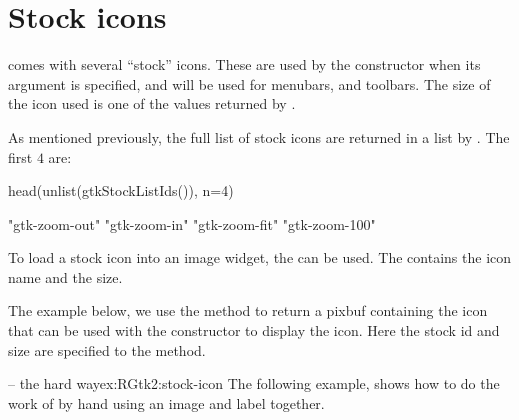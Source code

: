 \section{Stock icons}
\label{sec:RGtk2:stock-icons}

\GTK\/ comes with several ``stock'' icons. These are used by the
 constructor when its  argument
is specified, and will be used for menubars, and toolbars. The size of
the icon used is one of the values returned by .

As mentioned previously, the full list of stock icons are returned in
a list by . The first $4$ are:
\begin{Schunk}
\begin{Sinput}
 head(unlist(gtkStockListIds()), n=4)   
\end{Sinput}
\begin{Soutput}
[1] "gtk-zoom-out" "gtk-zoom-in"  "gtk-zoom-fit" "gtk-zoom-100"
\end{Soutput}
\end{Schunk}

To load a stock icon into an image widget, the
 can be used. The
 contains the icon name and
 the size. 

The example below, we use the method  to
return a pixbuf containing the icon that can be used with the
constructor  to display the
icon. Here the stock id and size are specified to the
 method.



\begin{example}{ -- the hard way}{ex:RGtk2:stock-icon}
The following example, shows how to do the work of
 by hand using an image and label together.
\begin{Schunk}
\end{Schunk}
\end{example}

